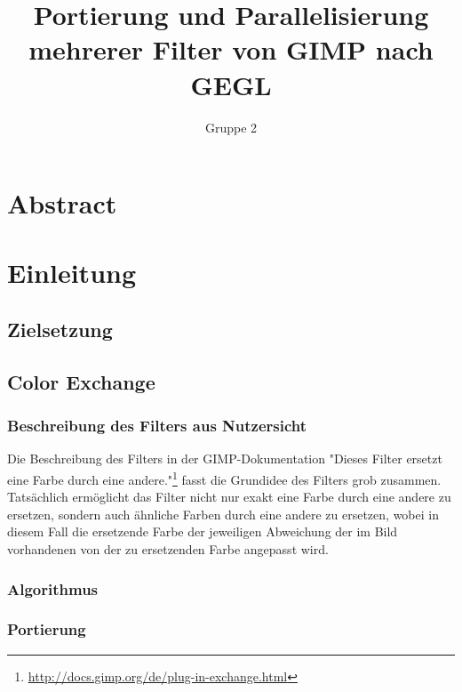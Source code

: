 \documentclass[10pt,a4paper,draft]{article}
\begin{document}
\author{Gruppe 2}
\title{Portierung und Parallelisierung mehrerer Filter von GIMP nach GEGL}
\maketitle

\section*{Abstract}


\section{Einleitung}
 
\subsection{Zielsetzung} %

\subsection{Color Exchange} 
\subsubsection{Beschreibung des Filters aus Nutzersicht}
Die Beschreibung des Filters in der GIMP-Dokumentation "Dieses Filter ersetzt eine Farbe durch eine andere."\footnote{\url{http://docs.gimp.org/de/plug-in-exchange.html}} fasst die Grundidee des Filters grob zusammen. Tatsächlich ermöglicht das Filter nicht nur exakt eine Farbe durch eine andere zu ersetzen, sondern auch ähnliche Farben durch eine andere zu ersetzen, wobei in diesem Fall die ersetzende Farbe der jeweiligen Abweichung der im Bild vorhandenen von der zu ersetzenden Farbe angepasst wird.
\subsubsection{Algorithmus} 
\subsubsection{Portierung}
\end{document}
